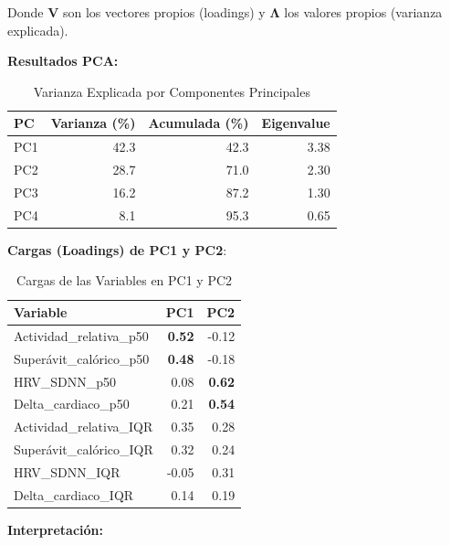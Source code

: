 \documentclass[12pt,letterpaper,twoside]{report}
\newcommand{\mat}[1]{\mathbf{#1}}
\begin{document}
\begin{calculobox}
\begin{estadisticobox}
Donde $\mat{V}$ son los vectores propios (loadings) y $\mat{\Lambda}$ los valores propios (varianza explicada).
\end{estadisticobox}

\begin{calculobox}
\textbf{Resultados PCA:}

\begin{table}[H]
\centering
\caption{Varianza Explicada por Componentes Principales}
\label{tab:pca_variance}
\begin{tabular}{@{}lrrr@{}}
\toprule
\textbf{PC} & \textbf{Varianza (\%)} & \textbf{Acumulada (\%)} & \textbf{Eigenvalue} \\
\midrule
PC1 & 42.3 & 42.3 & 3.38 \\
PC2 & 28.7 & 71.0 & 2.30 \\
PC3 & 16.2 & 87.2 & 1.30 \\
PC4 & 8.1  & 95.3 & 0.65 \\
\bottomrule
\end{tabular}
\end{table}

\textbf{Cargas (Loadings) de PC1 y PC2}:

\begin{table}[H]
\centering
\begin{tabular}{@{}lrr@{}}
\toprule
\textbf{Variable} & \textbf{PC1} & \textbf{PC2} \\
\midrule
Actividad\_relativa\_p50     & \textbf{0.52} & -0.12 \\
Superávit\_calórico\_p50     & \textbf{0.48} & -0.18 \\
HRV\_SDNN\_p50               & 0.08 & \textbf{0.62} \\
Delta\_cardiaco\_p50         & 0.21 & \textbf{0.54} \\
Actividad\_relativa\_IQR     & 0.35 & 0.28 \\
Superávit\_calórico\_IQR     & 0.32 & 0.24 \\
HRV\_SDNN\_IQR               & -0.05 & 0.31 \\
Delta\_cardiaco\_IQR         & 0.14 & 0.19 \\
\bottomrule
\end{tabular}
\caption{Cargas de las Variables en PC1 y PC2}
\label{tab:pca_loadings}
\end{table}
\end{calculobox}

\begin{decisionbox}
\textbf{Interpretación:}


\end{decisionbox}
\end{calculobox}
\end{document}
